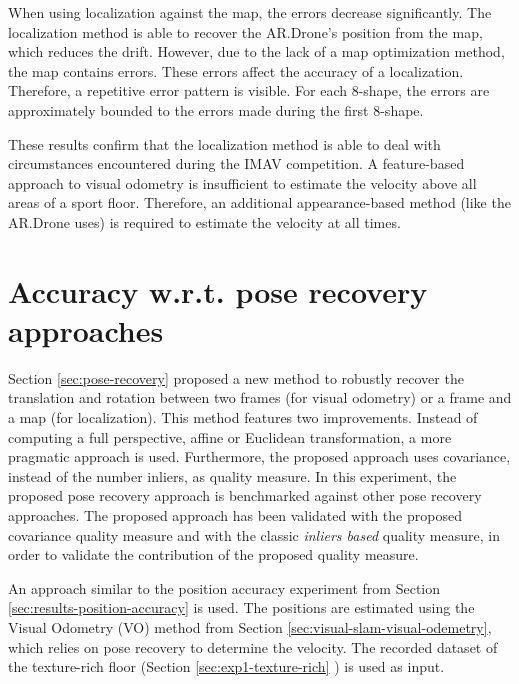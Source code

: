 When using localization against the map, the errors decrease significantly.
The localization method is able to recover the AR.Drone's position from the map, which reduces the drift.
However, due to the lack of a map optimization method, the map contains errors.
These errors affect the accuracy of a localization.
Therefore, a repetitive error pattern is visible.
For each 8-shape, the errors are approximately bounded to the errors made during the first 8-shape.

These results confirm that the localization method is able to deal with circumstances encountered during the IMAV competition.
A feature-based approach to visual odometry is insufficient to estimate the velocity above all areas of a sport floor.
Therefore, an additional appearance-based method (like the AR.Drone uses) is required to estimate the velocity at all times.


\clearpage
\section{Accuracy w.r.t. pose recovery approaches}
\label{sec:results-pose-recovery}
Section \ref{sec:pose-recovery} proposed a new method to robustly recover the translation and rotation between two frames (for visual odometry) or a frame and a map (for localization).
This method features two improvements.
Instead of computing a full perspective, affine or Euclidean transformation, a more pragmatic approach is used.
Furthermore, the proposed approach uses covariance, instead of the number inliers, as quality measure.
In this experiment, the proposed pose recovery approach is benchmarked against other pose recovery approaches.
The proposed approach has been validated with the proposed covariance quality measure and with the classic \textit{inliers based} quality measure, in order to validate the contribution of the proposed quality measure.

An approach similar to the position accuracy experiment from Section \ref{sec:results-position-accuracy} is used.
The positions are estimated using the Visual Odometry (VO) method from Section \ref{sec:visual-slam-visual-odemetry}, which relies on pose recovery to determine the velocity.
The recorded dataset of the texture-rich floor (Section \ref{sec:exp1-texture-rich} ) is used as input.
 
